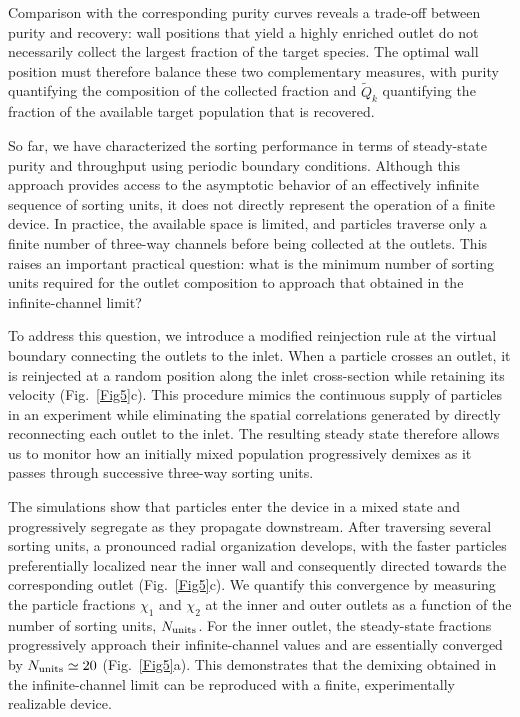\documentclass[aps,pre,twocolumn,amsmath,amssymb,notitlepage,superscriptaddress,longbibliography,nofootinbib,10pt]{revtex4-1}
\begin{document}
Comparison with the corresponding purity curves reveals a trade-off between purity and recovery: wall positions that yield a highly enriched outlet do not necessarily collect the largest fraction of the target species. The optimal wall position must therefore balance these two complementary measures, with purity quantifying the composition of the collected fraction and $\tilde{Q}_{k}$ quantifying the fraction of the available target population that is recovered.

So far, we have characterized the sorting performance in terms of steady-state purity and throughput using periodic boundary conditions. Although this approach provides access to the asymptotic behavior of an effectively infinite sequence of sorting units, it does not directly represent the operation of a finite device. In practice, the available space is limited, and particles traverse only a finite number of three-way channels before being collected at the outlets. This raises an important practical question: what is the minimum number of sorting units required for the outlet composition to approach that obtained in the infinite-channel limit?

To address this question, we introduce a modified reinjection rule at the virtual boundary connecting the outlets to the inlet. When a particle crosses an outlet, it is reinjected at a random position along the inlet cross-section while retaining its velocity (Fig.~\ref{Fig5}c). This procedure mimics the continuous supply of particles in an experiment while eliminating the spatial correlations generated by directly reconnecting each outlet to the inlet. The resulting steady state therefore allows us to monitor how an initially mixed population progressively demixes as it passes through successive three-way sorting units.

The simulations show that particles enter the device in a mixed state and progressively segregate as they propagate downstream. After traversing several sorting units, a pronounced radial organization develops, with the faster particles preferentially localized near the inner wall and consequently directed towards the corresponding outlet (Fig.~\ref{Fig5}c). We quantify this convergence by measuring the particle fractions $\chi_1$ and $\chi_2$ at the inner and outer outlets as a function of the number of sorting units, $N_{\rm units}$. For the inner outlet, the steady-state fractions progressively approach their infinite-channel values and are essentially converged by $N_{\rm units}\simeq20$ (Fig.~\ref{Fig5}a). This demonstrates that the demixing obtained in the infinite-channel limit can be reproduced with a finite, experimentally realizable device.
\end{document}
